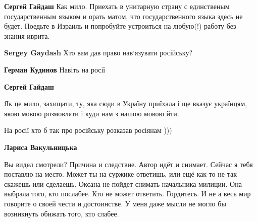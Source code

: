 \begin{itemize}
\begin{itemize}
\textbf{Сергей Гайдаш} Как мило. Приехать в унитарную страну с единственым
государственным языком и орать матом, что государственного языка здесь не
будет. Поедьте в Израиль и попробуйте устроиться на любую(!) работу без знания
иврита.

 
\textbf{Sergey Gaydash} Хто вам дав право нав‘язувати російську?

 
\textbf{Герман Кудинов}
Навіть на росії

 
\textbf{Сергей Гайдаш} 

Як це мило, захищати, ту, яка сюди в Україну приїхала і ще вказує українцям,
якою мовою розмовляти і куди нам з нашою мовою йти.

На росії хто б так про російську розказав росіянам )))

 
\textbf{Лариса Вакульницька} 

Вы видел смотрели? Причина и следствие. Автор идёт и снимает. Сейчас я тебя
поставлю на место. Может ты на суржике ответишь, или ещё как-то не так скажешь
или сделаешь. Оксана не пойдет снимать начальника милиции. Она выбрала того,
кто послабее. Кто не может ответить. Гордитесь. И не а весь мир говорите о
своей чести и достоинстве. У меня даже мысли не могло бы возникнуть обижать
того, кто слабее.


 

\end{itemize}
\end{itemize}
